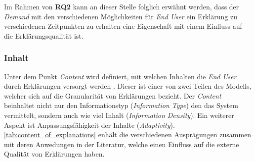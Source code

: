 \smallskip

Im Rahmen von \textbf{RQ2} kann an dieser Stelle folglich erwähnt werden, dass der \textit{Demand} mit den verschiedenen Möglichkeiten für \textit{End User} ein Erklärung zu verschiedenen Zeitpunkten zu erhalten eine Eigenschaft mit einem Einfluss auf die Erklärungsqualität ist.

\subsubsection{Inhalt}

Unter dem Punkt \textit{Content} wird definiert, mit welchen Inhalten die \textit{End User} durch Erklärungen versorgt werden \cite{nunes_systematic_2017}. Dieser ist einer von zwei Teilen des Modells, welcher sich auf die Granularität von Erklärungen bezieht. Der \textit{Content} beinhaltet nicht nur den Informationstyp (\textit{Information Type}) den das System vermittelt, sondern auch wie viel Inhalt (\textit{Information Density}). Ein weiterer Aspekt ist Anpassungsfähigkeit der Inhalte (\textit{Adaptivity}). \autoref{tab:content_of_explanations} enhält die verschiedenen Ausprägungen zusammen mit deren Anwedungen in der Literatur, welche einen Einfluss auf die externe Qualität von Erklärungen haben.

